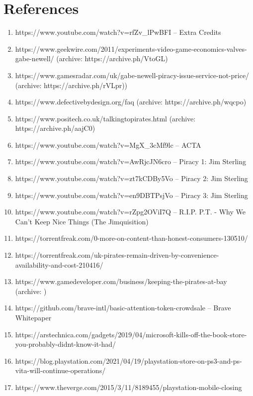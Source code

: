 \documentclass{article}
\begin{document}
{{\noindent{}

\section*{References}

\begin{enumerate}
    \item https://www.youtube.com/watch?v=rfZv\_lPwBFI -- Extra Credits
    \item https://www.geekwire.com/2011/experiments-video-game-economics-valves-gabe-newell/ (archive: https://archive.ph/VtoGL)
    \item https://www.gamesradar.com/uk/gabe-newell-piracy-issue-service-not-price/ (archive: https://archive.ph/rVLpr))
    \item https://www.defectivebydesign.org/faq (archive: https://archive.ph/wqcpo)
    \item https://www.positech.co.uk/talkingtopirates.html (archive: https://archive.ph/aajC0)
    \item https://www.youtube.com/watch?v=MgX\_3cMf9lc -- ACTA
    \item https://www.youtube.com/watch?v=AwRjcJN6cro -- Piracy 1: Jim Sterling
    \item https://www.youtube.com/watch?v=zt7kCDBy5Vo -- Piracy 2: Jim Sterling
    \item https://www.youtube.com/watch?v=en9DBTPsjVo -- Piracy 3: Jim Sterling
    \item https://www.youtube.com/watch?v=rZpg2OViI7Q -- R.I.P. P.T. - Why We Can't Keep Nice Things (The Jimquisition)
    \item https://torrentfreak.com/0-more-on-content-than-honest-consumers-130510/
    \item https://torrentfreak.com/uk-pirates-remain-driven-by-convenience-availability-and-cost-210416/
    \item https://www.gamedeveloper.com/business/keeping-the-pirates-at-bay (archive: )
    \item https://github.com/brave-intl/basic-attention-token-crowdsale  -- Brave Whitepaper
    \item https://arstechnica.com/gadgets/2019/04/microsoft-kills-off-the-book-store-you-probably-didnt-know-it-had/
    \item https://blog.playstation.com/2021/04/19/playstation-store-on-ps3-and-ps-vita-will-continue-operations/
    \item https://www.theverge.com/2015/3/11/8189455/playstation-mobile-closing

\end{enumerate}}}
\end{document}
